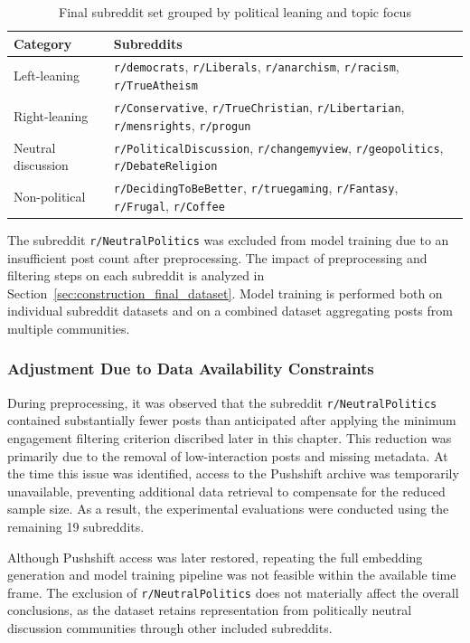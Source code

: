 \begin{table}[htbp]
\centering
\caption{Final subreddit set grouped by political leaning and topic focus}
\label{tab:subreddit_set}
\begin{tabular}{@{}ll@{}}
\toprule
\textbf{Category} & \textbf{Subreddits} \\
\midrule
Left-leaning & \verb!r/democrats!, \verb!r/Liberals!, \verb!r/anarchism!, \verb!r/racism!, \verb!r/TrueAtheism! \\
Right-leaning & \verb!r/Conservative!, \verb!r/TrueChristian!, \verb!r/Libertarian!, \verb!r/mensrights!, \verb!r/progun! \\
Neutral discussion & \verb!r/PoliticalDiscussion!, \verb!r/changemyview!, \verb!r/geopolitics!, \verb!r/DebateReligion! \\
Non-political & \verb!r/DecidingToBeBetter!, \verb!r/truegaming!, \verb!r/Fantasy!, \verb!r/Frugal!, \verb!r/Coffee! \\
\bottomrule
\end{tabular}
\end{table}

The subreddit \verb!r/NeutralPolitics! was excluded from model training due to an insufficient post count after preprocessing.
The impact of preprocessing and filtering steps on each subreddit is analyzed in Section~\ref{sec:construction_final_dataset}. Model training is performed both on individual subreddit datasets and on a combined dataset aggregating posts from multiple communities.

\subsubsection*{Adjustment Due to Data Availability Constraints}

During preprocessing, it was observed that the subreddit \verb!r/NeutralPolitics! contained substantially fewer posts than anticipated after applying the minimum engagement filtering criterion discribed later in this chapter. This reduction was primarily due to the removal of low-interaction posts and missing metadata. At the time this issue was identified, access to the Pushshift archive was temporarily unavailable, preventing additional data retrieval to compensate for the reduced sample size. As a result, the experimental evaluations were conducted using the remaining 19 subreddits.

Although Pushshift access was later restored, repeating the full embedding generation and model training pipeline was not feasible within the available time frame. The exclusion of \verb!r/NeutralPolitics! does not materially affect the overall conclusions, as the dataset retains representation from politically neutral discussion communities through other included subreddits.

